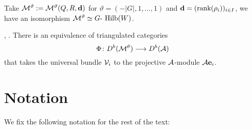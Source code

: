 \documentclass{amsart}
\theoremstyle{definition}
\newcommand\pgap{\vspace{10pt}}
\newcommand\W{W}
\begin{document}
Take $\mathcal{M}^\vartheta:=\mathcal{M}^\vartheta(Q,R,\mathbf{d})$ for $\vartheta = (-|G|,1, \ldots, 1)$ and $\mathbf{d}=(\text{rank}(\rho_i))_{i \in I}$, we have an isomorphism $\cM^\vartheta \simeq G\text{- Hilb}(\W)$.

\begin{theorem}\cite{MR740077}, \cite{MR1752785}.
There is an equivalence of triangulated categories $$\Phi \colon D^b(\mathcal{M}^\theta) \longrightarrow D^b(\mathcal{A})$$ that takes the universal bundle $\mathcal{V}_i$ to the projective $\mathcal{A}$-module $\mathcal{A}\mathbf{e}_i$.
\end{theorem}

\section*{Notation}
We fix the following notation for the rest of the text:
\pgap
\end{document}
